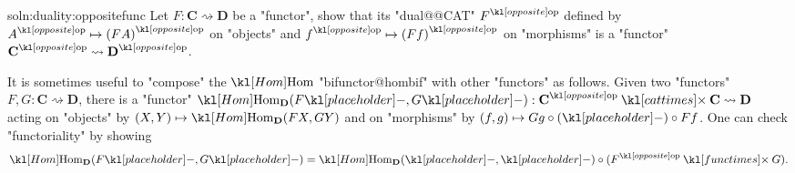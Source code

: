 \documentclass[main.tex]{subfiles}
\begin{document}
\begin{exer}{soln:duality:oppositefunc}\label{exer:duality:oppositefunc}
	Let $F: \mathbf{C} \rightsquigarrow \mathbf{D}$ be a "functor", show that its "dual@@CAT" $\op{F}$ defined by $\op{A} \mapsto \op{(FA)}$ on "objects" and $\op{f} \mapsto \op{(Ff)}$ on "morphisms" is a "functor" $\op{\mathbf{C}} \rightsquigarrow \op{\mathbf{D}}$. 
\end{exer}
\begin{rem}\label{rem:hombifunctor}
	It is sometimes useful to "compose" the $\Hom$ "bifunctor@hombif" with other "functors" as follows. Given two "functors" $F,G: \mathbf{C} \rightsquigarrow \mathbf{D}$, there is a "functor" $\Hom_{\mathbf{D}}(F\placeholder,G\placeholder): \op{\mathbf{C}} \cattimes \mathbf{C} \rightsquigarrow \mathbf{D}$ acting on "objects" by $(X,Y) \mapsto \Hom_{\mathbf{D}}(FX,GY)$ and on "morphisms" by $(f,g) \mapsto Gg \circ (\placeholder) \circ Ff$.	One can check "functoriality" by showing
	\[\Hom_{\mathbf{D}}(F\placeholder,G\placeholder) = \Hom_{\mathbf{D}}(\placeholder,\placeholder) \circ (\op{F}\functimes G).\]
\end{rem}
\end{document}
